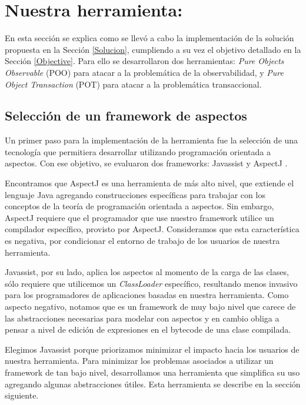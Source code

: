 \section{Nuestra herramienta: }

	En esta sección se explica como se llevó a cabo la implementación de la solución
	propuesta en la Sección \ref{Solucion}, cumpliendo a su vez el objetivo
	detallado en la Sección \ref{Objective}. Para ello se desarrollaron dos
	herramientas:
	\emph{Pure Objects Observable} (POO) para atacar a la problemática de la
	observabilidad, y \emph{Pure Object Transaction} (POT) para atacar a la
	problemática transaccional.
		
	\subsection{Selección de un framework de aspectos}  
		Un primer paso para la implementación de la herramienta fue la selección de una
		tecnología que permitiera desarrollar utilizando programación orientada a
		aspectos.
		Con ese objetivo, se evaluaron dos frameworks: Javassist
		\cite{chiba00loadtime} y AspectJ \cite{KiczalesHHKPG01}.
		
		\medskip 
		Encontramos que AspectJ es una herramienta de más alto nivel, que extiende
		el lenguaje Java agregando construcciones específicas para trabajar con
		los conceptos de la teoría de programación orientada a aspectos.
		Sin embargo, AspectJ requiere que el programador que use nuestro framework
		utilice un compilador específico, provisto por AspectJ. 
		Consideramos que esta característica es negativa, por condicionar el
		entorno de trabajo de los usuarios de nuestra herramienta.
		
		Javassist, por su lado, aplica los aspectos al momento de
		la carga de las clases, sólo requiere que utilicemos un \emph{ClassLoader}
		específico, resultando menos invasivo para los programadores de aplicaciones
		basadas en nuestra herramienta.
		Como aspecto negativo, notamos que es un framework de muy bajo nivel que
		carece de las abstracciones necesarias para modelar con aspectos y en cambio
		obliga a pensar a nivel de edición de expresiones en el bytecode de una clase
		compilada.
		
		Elegimos Javassist porque priorizamos minimizar el impacto hacia los usuarios
		de nuestra herramienta.
		Para minimizar los problemas asociados a utilizar un framework de tan bajo
		nivel, desarrollamos una herramienta que simplifica su uso agregando algunas
		abstracciones útiles. Esta herramienta se describe en la sección siguiente.

